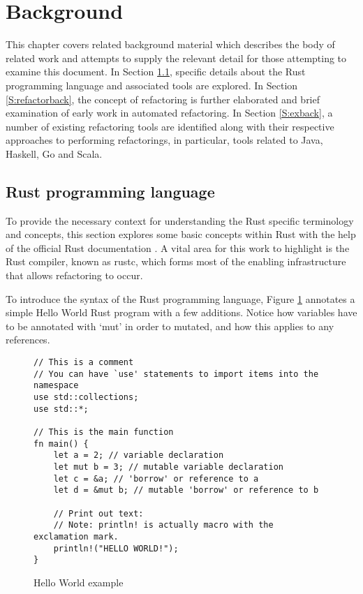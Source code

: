 \section{Background}\label{C:back} 
This chapter covers related background material which describes the body of related work and attempts to supply the relevant detail for those attempting to examine this document. In Section \ref{S:rustback}, specific details about the Rust programming language and associated tools are explored. In Section \ref{S:refactorback}, the concept of refactoring is further elaborated and brief examination of early work in automated refactoring. In Section \ref{S:exback}, a number of existing refactoring tools are identified along with their respective approaches to performing refactorings, in particular, tools related to Java, Haskell, Go and Scala. 

\subsection{Rust programming language}\label{S:rustback}
To provide the necessary context for understanding the Rust specific terminology and concepts, this section explores some basic concepts within Rust with the help of the official Rust documentation \cite{doc15}. A vital area for this work to highlight is the Rust compiler, known as rustc, which forms most of the enabling infrastructure that allows refactoring to occur. 

To introduce the syntax of the Rust programming language, Figure \ref{Fig:hello} annotates a simple Hello World Rust program with a few additions. Notice how variables have to be annotated with `mut' in order to mutated, and how this applies to any references.

\begin{figure}[H]
\centering
\begin{verbatim}
// This is a comment
// You can have `use' statements to import items into the namespace
use std::collections;
use std::*;

// This is the main function
fn main() {
    let a = 2; // variable declaration
    let mut b = 3; // mutable variable declaration
    let c = &a; // 'borrow' or reference to a
    let d = &mut b; // mutable 'borrow' or reference to b

    // Print out text:
    // Note: println! is actually macro with the exclamation mark.
    println!("HELLO WORLD!");
}
\end{verbatim}
\caption{Hello World example}
\label{Fig:hello}
\end{figure}

